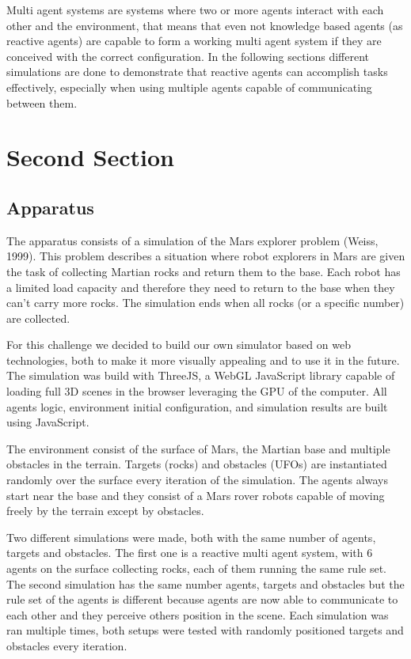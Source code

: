 \documentclass[runningheads]{llncs}
\begin{document}
Multi agent systems are systems where two or more agents interact with each other and the environment, that means that even not knowledge based agents (as reactive agents) are capable to form a working multi agent system if they are conceived with the correct configuration. In the following sections different simulations are done to demonstrate that reactive agents can accomplish tasks effectively, especially when using multiple agents capable of communicating between them.

\section{Second Section}
\subsection{Apparatus}

The apparatus consists of a simulation of the Mars explorer problem (Weiss, 1999). This problem describes a situation where robot explorers in Mars are given the task of collecting Martian rocks and return them to the base. Each robot has a limited load capacity and therefore they need to return to the base when they can't carry more rocks. The simulation ends when all rocks (or a specific number) are collected.

For this challenge we decided to build our own simulator based on web technologies, both to make it more visually appealing and to use it in the future. The simulation was build with ThreeJS, a WebGL JavaScript library capable of loading full 3D scenes in the browser leveraging the GPU of the computer. All agents logic, environment initial configuration, and simulation results are built using JavaScript.

The environment consist of the surface of Mars, the Martian base and multiple obstacles in the terrain. Targets (rocks) and obstacles (UFOs) are instantiated randomly over the surface every iteration of the simulation. The agents always start near the base and they consist of a Mars rover robots capable of moving freely by the terrain except by obstacles.

Two different simulations were made, both with the same number of agents, targets and obstacles. The first one is a reactive multi agent system, with 6 agents on the surface collecting rocks, each of them running the same rule set. The second simulation has the same number agents, targets and obstacles but the rule set of the agents is different because agents are now able to communicate to each other and they perceive others position in the scene. Each simulation was ran multiple times, both setups were tested with randomly positioned targets and obstacles every iteration.
\end{document}
